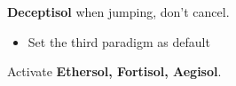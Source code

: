 	\textbf{Deceptisol} when jumping, don't cancel.

	\begin{menu}
		\begin{itemize}
			\paradigm
				      \begin{itemize}
					      \item Set the third paradigm as default
				      \end{itemize}
		\end{itemize}
	\end{menu}
	
	Activate \textbf{Ethersol, Fortisol, Aegisol}.
	\vfill

	\renewcommand{\second}{[2] Devastation (\sab/\com/\com)}
	\renewcommand{\fifth}{[5] Smart Bomb (\sab/\rav/\rav)}
	\renewcommand{\sixth}{[6] Tri-Disaster (\rav/\rav/\rav)}
	\renewcommand{\third}{[3] Premeditation (\sab/\sen/\syn)}
	\renewcommand{\first}{[1] Tireless Charge (\med/\com/\com)}

